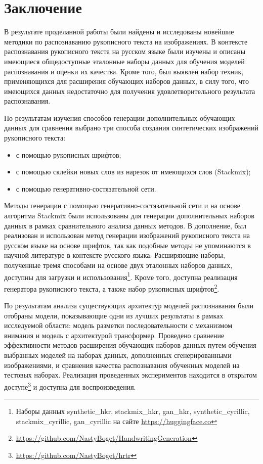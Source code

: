 \section{Заключение}
\label{sec:Chapter5} 

В результате проделанной работы были найдены и исследованы новейшие методики по распознаванию рукописного текста на изображениях.
В контексте распознавания рукописного текста на русском языке были изучены и описаны имеющиеся общедоступные эталонные наборы данных
для обучения моделей распознавания и оценки их качества.
Кроме того, был выявлен набор техник, применяющихся для расширения обучающих наборов данных,
в силу того, что имеющихся данных недостаточно для получения удовлетворительного результата распознавания.

По результатам изучения способов генерации дополнительных обучающих данных для сравнения выбрано три способа создания синтетических изображений рукописного текста:
\begin{itemize}
    \item с помощью рукописных шрифтов;
    \item с помощью склейки новых слов из нарезок от имеющихся слов (Stackmix);
    \item с помощью генеративно-состязательной сети.
\end{itemize}

Методы генерации с помощью генеративно-состязательной сети и на основе алгоритма Stackmix были использованы для генерации
дополнительных наборов данных в рамках сравнительного анализа данных методов.
В дополнение, был реализован и использован метод генерации изображений рукописного текста на русском языке на основе шрифтов,
так как подобные методы не упоминаются в научной литературе в контексте русского языка.
Расширяющие наборы, полученные тремя способами на основе двух эталонных наборов данных, доступны для загрузки
и использования\footnote{Наборы данных synthetic\_hkr, stackmix\_hkr, gan\_hkr, synthetic\_cyrillic, stackmix\_cyrillic, gan\_cyrillic на сайте \url{https://huggingface.co}}.
Кроме того, доступна реализация генератора рукописного текста, а также набор рукописных шрифтов\footnote{\url{https://github.com/NastyBoget/HandwritingGeneration}}.

По результатам анализа существующих архитектур моделей распознавания были отобраны модели, показывающие одни из лучших
результаты в рамках исследуемой области: модель разметки последовательности с механизмом внимания и модель с архитектурой трансформер.
Проведено сравнение эффективности методов расширения обучающих наборов данных путем обучения выбранных моделей
на наборах данных, дополненных сгенерированными изображениями, и сравнения качества распознавания обученных моделей на тестовых наборах.
Реализация проведенных экспериментов находится в открытом доступе\footnote{\url{https://github.com/NastyBoget/hrtr}} и доступна для воспроизведения.

